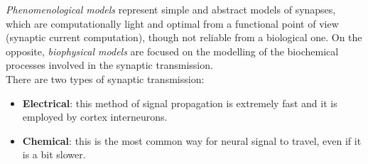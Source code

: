 \textit{Phenomenological models} represent simple and abstract models of synapses, which are
computationally light and optimal from a functional point of view (synaptic current computation), though not reliable
from a biological one. On the opposite, \textit{biophysical models} are focused on the modelling
of the biochemical processes involved in the synaptic transmission.\\
There are two types of synaptic transmission:
\begin{itemize}
    \item \textbf{Electrical}: this method of signal propagation is extremely
          fast and it is employed by cortex interneurons.
    \item \textbf{Chemical}: this is the most common way for neural signal
          to travel, even if it is a bit slower.
\end{itemize}

